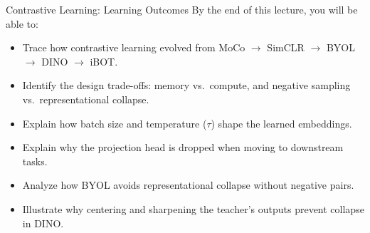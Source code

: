 \begin{frame}[allowframebreaks]{Contrastive Learning: Learning Outcomes}
    By the end of this lecture, you will be able to:
    \begin{itemize}
        \setlength{\itemsep}{-0.1em}
        \item Trace how contrastive learning evolved from MoCo $\rightarrow$ SimCLR $\rightarrow$ BYOL $\rightarrow$ DINO $\rightarrow$ iBOT.
        \item Identify the design trade-offs: memory vs.\ compute, and negative sampling vs.\ representational collapse.
        \item Explain how batch size and temperature ($\tau$) shape the learned embeddings.
        \item Explain why the projection head is dropped when moving to downstream tasks.
        \item Analyze how BYOL avoids representational collapse without negative pairs.
        \item Illustrate why centering and sharpening the teacher's outputs prevent collapse in DINO.
    \end{itemize}
\end{frame}

